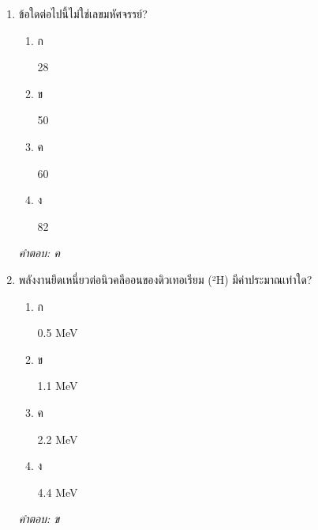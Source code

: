 \documentclass[12pt]{article}
\begin{document}
\begin{enumerate}[label=\arabic*., itemsep=0.5\baselineskip, topsep=0.5\baselineskip, leftmargin=*]
\item ข้อใดต่อไปนี้ไม่ใช่เลขมหัศจรรย์?
\begin{enumerate}[label=\alph*)., itemsep=0.3\baselineskip, topsep=0.3\baselineskip]
\item ก\ 
\begin{minipage}[t]{0.9\linewidth}
\raggedright 28
\end{minipage}
\item ข\ 
\begin{minipage}[t]{0.9\linewidth}
\raggedright 50
\end{minipage}
\item ค\ 
\begin{minipage}[t]{0.9\linewidth}
\raggedright 60
\end{minipage}
\item ง\ 
\begin{minipage}[t]{0.9\linewidth}
\raggedright 82
\end{minipage}
\end{enumerate}
\vspace{-0.3\baselineskip}
\begin{small}
\textit{คำตอบ: ค}
\end{small}

\item พลังงานยึดเหนี่ยวต่อนิวคลีออนของดิวเทอเรียม (²H) มีค่าประมาณเท่าใด?
\begin{enumerate}[label=\alph*)., itemsep=0.3\baselineskip, topsep=0.3\baselineskip]
\item ก\ 
\begin{minipage}[t]{0.9\linewidth}
\raggedright 0.5 MeV
\end{minipage}
\item ข\ 
\begin{minipage}[t]{0.9\linewidth}
\raggedright 1.1 MeV
\end{minipage}
\item ค\ 
\begin{minipage}[t]{0.9\linewidth}
\raggedright 2.2 MeV
\end{minipage}
\item ง\ 
\begin{minipage}[t]{0.9\linewidth}
\raggedright 4.4 MeV
\end{minipage}
\end{enumerate}
\vspace{-0.3\baselineskip}
\begin{small}
\textit{คำตอบ: ข}
\end{small}


\end{enumerate}
\end{document}
